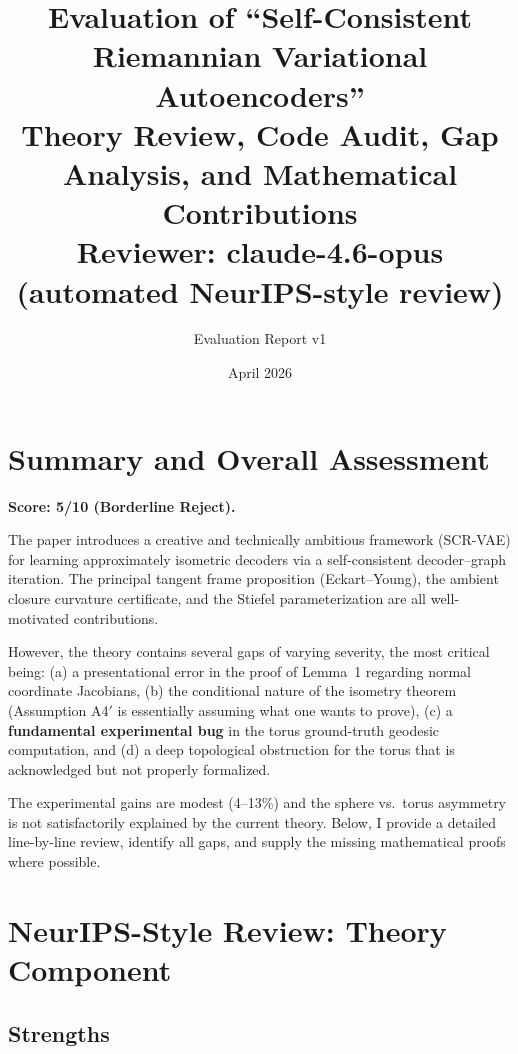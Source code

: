 \documentclass{article}
\title{Evaluation of ``Self-Consistent Riemannian Variational Autoencoders''\\[6pt]
\large Theory Review, Code Audit, Gap Analysis, and Mathematical Contributions\\[4pt]
\normalsize Reviewer: claude-4.6-opus (automated NeurIPS-style review)}
\author{Evaluation Report v1}
\date{April 2026}
\begin{document}
\maketitle
\tableofcontents
\newpage

\section{Summary and Overall Assessment}

\begin{verdict}
\textbf{Score: 5/10 (Borderline Reject).}

The paper introduces a creative and technically ambitious framework (SCR-VAE)
for learning approximately isometric decoders via a self-consistent
decoder--graph iteration. The principal tangent frame proposition
(Eckart--Young), the ambient closure curvature certificate, and the
Stiefel parameterization are all well-motivated contributions.

However, the theory contains several gaps of varying severity, the most critical
being: (a) a presentational error in the proof of Lemma~1 regarding normal
coordinate Jacobians, (b) the conditional nature of the isometry theorem
(Assumption A4$'$ is essentially assuming what one wants to prove), (c) a
\textbf{fundamental experimental bug} in the torus ground-truth geodesic
computation, and (d) a deep topological obstruction for the torus that is
acknowledged but not properly formalized.

The experimental gains are modest (4--13\%) and the sphere vs.\ torus asymmetry
is not satisfactorily explained by the current theory. Below, I provide a
detailed line-by-line review, identify all gaps, and supply the missing
mathematical proofs where possible.
\end{verdict}

\section{NeurIPS-Style Review: Theory Component}
\label{sec:review}

\subsection{Strengths}
\end{document}
